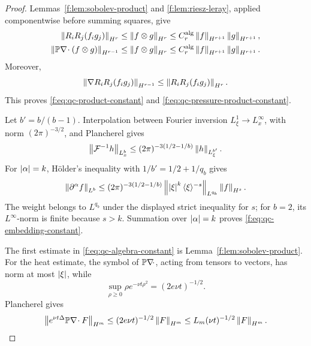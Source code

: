 \begin{proof}
Lemmas~\ref{f:lem:sobolev-product} and \ref{f:lem:riesz-leray}, applied
componentwise before summing squares, give
\begin{align*}
 \left\lVert R_iR_j(f_i g_j)\right\rVert_{H^r}
 &\le\left\lVert f\otimes g\right\rVert_{H^r}
 \le C_r^{\rm alg}\left\lVert f\right\rVert_{H^{r+1}}\left\lVert g\right\rVert_{H^{r+1}},\\
 \left\lVert \mathbb P\nabla\!\cdot(f\otimes g)\right\rVert_{H^{r-1}}
 &\le\left\lVert f\otimes g\right\rVert_{H^r}
 \le C_r^{\rm alg}\left\lVert f\right\rVert_{H^{r+1}}\left\lVert g\right\rVert_{H^{r+1}}.
\end{align*}
Moreover,
\[
 \left\lVert \nabla R_iR_j(f_i g_j)\right\rVert_{H^{r-1}}
 \le\left\lVert R_iR_j(f_i g_j)\right\rVert_{H^r}.
\]
This proves \eqref{f:eq:qc-product-constant} and
\eqref{f:eq:qc-pressure-product-constant}.

Let \(b'=b/(b-1)\).  Interpolation between Fourier inversion
\(L^1_\xi\to L^\infty_x\), with norm \((2\pi)^{-3/2}\), and Plancherel
gives
\[
 \left\lVert \mathcal F^{-1}h\right\rVert_{L^b_x}
 \le(2\pi)^{-3(1/2-1/b)}\left\lVert h\right\rVert_{L^{b'}_\xi}.
\]
For \(\left|\alpha\right|=k\), H\"older's inequality with
\(1/b'=1/2+1/q_b\) gives
\[
 \left\lVert \partial^\alpha f\right\rVert_{L^b}
 \le(2\pi)^{-3(1/2-1/b)}
 \left\lVert \left|\xi\right|^k\langle\xi\rangle^{-s}\right\rVert_{L^{q_b}}
 \left\lVert f\right\rVert_{H^s}.
\]
The weight belongs to \(L^{q_b}\) under the displayed strict inequality
for \(s\); for \(b=2\), its \(L^\infty\)-norm is finite because \(s>k\).
Summation over \(\left|\alpha\right|=k\) proves
\eqref{f:eq:qc-embedding-constant}.

The first estimate in \eqref{f:eq:qc-algebra-constant} is
Lemma~\ref{f:lem:sobolev-product}.  For the heat estimate, the symbol of
\(\mathbb P\nabla\!\cdot\), acting from tensors to vectors, has norm at most
\(\left|\xi\right|\), while
\[
 \sup_{\rho\ge0}\rho e^{-\nu t\rho^2}=(2e\nu t)^{-1/2}.
\]
Plancherel gives
\[
 \left\lVert e^{\nu t\Delta}\mathbb P\nabla\!\cdot F\right\rVert_{H^m}
 \le(2e\nu t)^{-1/2}\left\lVert F\right\rVert_{H^m}
 \le L_m(\nu t)^{-1/2}\left\lVert F\right\rVert_{H^m}.
\]
\end{proof}

